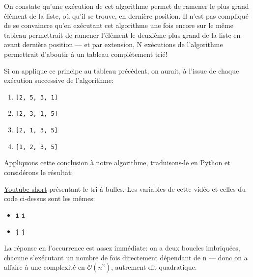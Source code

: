 \documentclass[12pt]{article}
\begin{document}
	\begin{MaReponse}
		On constate qu'une exécution de cet algorithme permet de ramener le plus grand élément de la liste, où qu'il se trouve, en dernière position. Il n'est pas compliqué de se convaincre qu'en exécutant cet algorithme une fois encore sur le même tableau permettrait de ramener l'élément le deuxième plus grand de la liste en avant dernière position --- et par extension, N exécutions de l'algorithme permettrait d'aboutir à un tableau complètement trié!
		
		Si on applique ce principe au tableau précédent, on aurait, à l'issue de chaque exécution successive de l'algorithme:
		\begin{enumerate}
			\item \texttt{[2, 5, 3, 1]}
			\item \texttt{[2, 3, 1, 5]}
			\item \texttt{[2, 1, 3, 5]}
			\item \texttt{[1, 2, 3, 5]}
		\end{enumerate}
	\end{MaReponse}
	
	Appliquons cette conclusion à notre algorithme, traduisons-le en Python et considérons le résultat:
	
	\begin{MaVid}
		\href{https://www.youtube.com/shorts/y2AghjB4Wxs?feature=share}{Youtube short} présentant le tri à bulles. Les variables de cette vidéo et celles du code ci-dessus sont les mêmes:
		\begin{itemize}
			\item \texttt{i} \quad \faExchange \quad \texttt{i}
			\item \texttt{j} \quad \faExchange \quad \texttt{j}
		\end{itemize}
	\end{MaVid}
	
	
	\begin{MaReponse}
		La réponse en l'occurrence est assez immédiate: on a deux boucles imbriquées, chacune s'exécutant un nombre de fois directement dépendant de n --- donc on a affaire à une complexité en $\mathcal{O}(n^2)$, autrement dit quadratique.
	\end{MaReponse}
	
\end{document}
